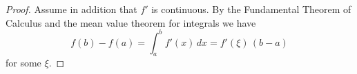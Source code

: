 

\begin{proof} Assume in addition that $f'$ is continuous.
By the Fundamental Theorem of Calculus and the mean value theorem 
for integrals we have 
$$
f(b)-f(a) = \int_a^b f'(x)\,dx = f'(\xi)\,(b-a)
$$
for some $\xi$.

\end{proof}

